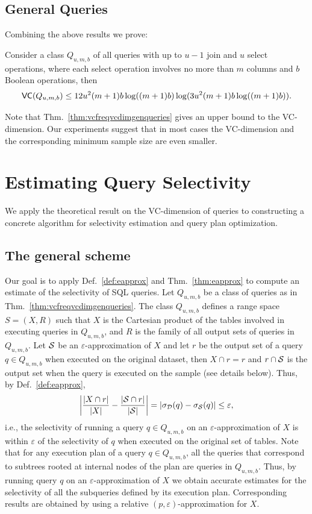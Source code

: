 \subsection{General Queries}\label{sec:vcfreqvcdimgenqueries}
Combining the above results we prove:
\begin{theorem}\label{thm:vcfreqvcdimgenqueries}
Consider a class $Q_{u,m,b}$ of all queries with up to $u-1$ join and $u$ select
operations, where each select operation involves no more than $m$ columns and $b$
Boolean operations, then 
\[
\mathsf{VC}(Q_{u,m,b}) \leq
12u^2(m+1)b\log((m+1)b)\log(3u^2(m+1)b\log((m+1)b)).\]
\end{theorem}

Note that Thm.~\ref{thm:vcfreqvcdimgenqueries} gives an upper bound to the
VC-dimension. Our experiments suggest that in most cases the VC-dimension and
the corresponding minimum sample size are even smaller.

\section{Estimating Query Selectivity}\label{sec:vcfreqapplications}
We apply the theoretical result on the VC-dimension of queries 
to constructing a concrete
algorithm for selectivity estimation and query plan optimization.

\subsection{The general scheme}
Our goal is to apply Def.~\ref{def:eapprox} and Thm.~\ref{thm:eapprox} to
compute an estimate of the selectivity of SQL queries. Let $Q_{u,m,b}$ be a
class of queries as in Thm.~\ref{thm:vcfreqvcdimgenqueries}.
The class $Q_{u,m,b}$ defines a range space $S=(X,R)$ such that $X$ is the
Cartesian product of the tables involved in executing queries in $Q_{u,m,b}$,
and $R$ is the family of all output sets of queries in $Q_{u,m,b}$. 
Let ${\cal S}$ be an $\varepsilon$-approximation of $X$ and
let $r$ be the output set
of a query $q\in Q_{u,m,b}$ when executed on the original dataset, then $X\cap
r=r$ and $r\cap {\cal S}$ is the output set when the query is executed on the sample
(see details below). Thus, by Def.~\ref{def:eapprox},
\[
\left|\frac{|X\cap r|}{|X|} - \frac{|{\cal S}\cap r|}{|{\cal S}|}\right|=
|\sigma_{\cal D}(q)-\sigma_{\cal S}(q)| \le\varepsilon,
\]
i.e., the selectivity of running a query $q\in Q_{u,m,b}$ on an $\varepsilon$-approximation of $X$ 
is
within $\varepsilon$ of the selectivity of $q$ when executed on the original set of tables.
Note that for any execution plan of a query $q\in Q_{u,m,b}$, all the queries
that correspond to subtrees rooted at internal nodes of the plan are queries in
$Q_{u,m,b}$. Thus, by running query $q$ on an $\varepsilon$-approximation of $X$ we obtain accurate
estimates for the selectivity of all the subqueries defined by its execution
plan. Corresponding results are obtained by using a relative
  $(p,\varepsilon)$-approximation for $X$.
  
